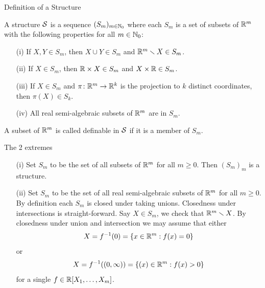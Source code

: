 \documentclass{beamer}
\begin{document}
\begin{frame}{Definition of a Structure}
  \begin{definition}
    A \alert{structure} ${\mathcal S}$ is a sequence $(S_m)_{m\in{\mathbb{N}}_0}$
    where each $S_m$ is a set of subsets of ${\mathbb{R}}^m$ with the following
    properties for all $m\in {\mathbb{N}}_0$:
    \begin{enumerate}
    \item [(i)] If $X,Y\in S_m$, then $X\cup Y\in S_m$ and
      ${\mathbb{R}}^m\smallsetminus X\in S_m$.
    \item[(ii)] If $X\in S_m$, then ${\mathbb{R}}\times X\in S_m$ and $X\times
      {\mathbb{R}}\in S_m$.
    \item[(iii)] If $X\in S_{m}$ and $\pi\colon
      {\mathbb{R}}^{m}\rightarrow{\mathbb{R}}^k$ is the projection to $k$ distinct
      coordinates, then 
      $\pi(X)\in S_k$.
    \item[(iv)] All real semi-algebraic subsets of ${\mathbb{R}}^m$ are in
      $S_m$.
    \end{enumerate}
    A subset of  ${\mathbb{R}}^m$ is called \alert{definable} in ${\mathcal S}$ if it
    is a member of $S_m$.
  \end{definition}

\end{frame}

\begin{frame}{The 2 extremes}
  \begin{example}
    \begin{enumerate}
    \item [(i)] Set $S_m$ to be the set of all subsets of ${\mathbb{R}}^m$ for
      all $m\ge 0$. Then $(S_m)_m$ is a structure. 
    \item[(ii)]
      Set $S_m$ to be the set of all real semi-algebraic subsets of ${\mathbb{R}}^m$
      for all $m\ge 0$. By definition each $S_m$ is closed under taking
      unions. Closedness under intersections is straight-forward. 
      Say $X\in S_m$, we check that ${\mathbb{R}}^m \smallsetminus X$. 
      By closedness under union and intersection we may assume that either 
      \begin{equation*}
        X = f^{-1}(0)=\{ x\in{\mathbb{R}}^m : f(x) = 0\}
      \end{equation*}
      or
      \begin{equation*}     
        X = f^{-1}((0,\infty))=\{ (x)\in{\mathbb{R}}^m : f(x) > 0\}
      \end{equation*}
      for a single $f\in{\mathbb{R}}[X_1,\ldots,X_m]$.
    \end{enumerate}
  \end{example}

\end{frame}
\end{document}
